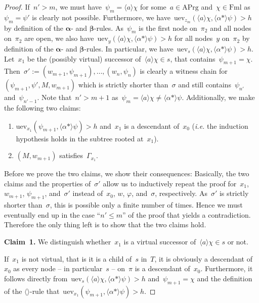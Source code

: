 \documentclass{entcs}
\newcommand{\ie}{\emph{i.e.}}
\newcommand{\pea}[2]{\langle#1\rangle #2}
\newcommand{\prp}[1]{#1*}
\newcommand{\fml}{\mathrm{Fml}}
\newcommand{\act}{\mathrm{APrg}}
\newcommand{\tuev}{\mathrm{uev}}
\newcommand{\talpha}{\boldsymbol{\alpha}}
\newcommand{\tbeta}{\boldsymbol{\beta}}
\newcommand{\trea}{$\langle\rangle$}
\newcommand{\fchn}{\sigma}
\begin{document}
\begin{proof}
  If~$n' > m$, we must have~$\psi_m = \pea{a}{\chi}$ for some~$a \in \act$ and~$\chi \in \fml$
  as~$\psi_m = \psi'$ is clearly not possible.
  Furthermore, we have~$\tuev_{z_m}(\pea{a}{\chi}, \pea{\prp{\alpha}}{\psi}) > h$
  by definition of the $\talpha$- and $\tbeta$-rules.
  As~$\psi_m$ is the first node on~$\pi_2$ 
  and all nodes on~$\pi_2$ are open,
  we also have~$\tuev_y(\pea{a}{\chi}, \pea{\prp{\alpha}}{\psi}) > h$ for all nodes~$y$ on~$\pi_2$
  by definition of the $\talpha$- and $\tbeta$-rules.
  In particular, we have~$\tuev_s(\pea{a}{\chi}, \pea{\prp{\alpha}}{\psi}) > h$.
  Let~$x_1$ be the (possibly virtual) successor of~$\pea{a}{\chi} \in s$,
  that contains~$\psi_{m+1} = \chi$.
  Then~$\fchn' := (w_{m+1}, \psi_{m+1}), \dotsc, (w_n, \psi_n)$ is clearly 
  a witness chain for~$(\psi_{m+1}, \psi', M, w_{m+1})$
  which is strictly shorter than~$\fchn$
  and still contains~$\psi_{n'}$ and~$\psi_{n'-1}$.
  Note that~$n' > m+1$ as~$\psi_m = \pea{a}{\chi} \neq \pea{\prp{\alpha}}{\psi}$.
  Additionally, we make the following two claims:
  \begin{enumerate}
  \item $\tuev_{x_1}(\psi_{m+1}, \pea{\prp{\alpha}}{\psi}) > h$ 
    and~$x_1$ is a descendant of~$x_0$
    (\ie{} the induction hypothesis holds in the subtree rooted at~$x_1$).
  \item $(M, w_{m+1})$ satisfies~$\Gamma_{x_1}$.
  \end{enumerate}
  Before we prove the two claims, we show their consequences:
  Basically, the two claims and the properties of~$\fchn'$ allow us
  to inductively repeat the proof
  for~$x_1$, $w_{m+1}$, $\psi_{m+1}$, and~$\fchn'$ instead of~$x_0$, $w$, $\varphi$, and~$\fchn$, respectively.
  As~$\fchn'$ is strictly shorter than~$\fchn$,
  this is possible only a finite number of times.
  Hence we must eventually end up in the case ``$n' \leq m$'' of the proof
  that yields a contradiction.
  Therefore the only thing left is to show that the two claims hold.

  \noindent{}\textbf{Claim~1.}
  We distinguish whether~$x_1$ is a virtual successor of~$\pea{a}{\chi} \in s$ or not.
  
  If~$x_1$ is not virtual,
  that is it is a child of~$s$ in~$T$,
  it is obviously a descendant of~$x_0$
  as every node -- in particular~$s$ -- on~$\pi$ is a descendant of~$x_0$.
  Furthermore,
  it follows directly from~$\tuev_s(\pea{a}{\chi}, \pea{\prp{\alpha}}{\psi}) > h$ and~$\psi_{m+1} = \chi$
  and the definition of the \trea{}-rule
  that~$\tuev_{x_1}(\psi_{m+1}, \pea{\prp{\alpha}}{\psi}) > h$.


\end{proof}
\end{document}
